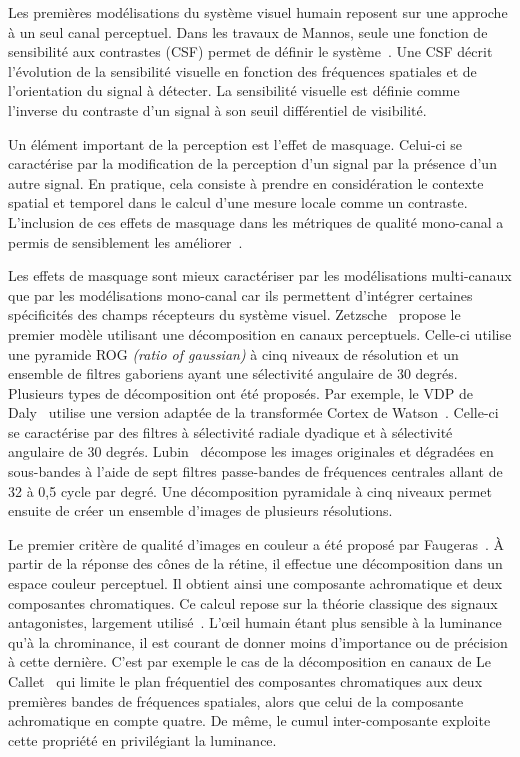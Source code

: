 Les premières modélisations du système visuel humain reposent sur une approche à un seul canal perceptuel. Dans les travaux de Mannos, seule une fonction de sensibilité aux contrastes (CSF) permet de définir le système~\cite{mannos-ieee1974}. Une CSF décrit l'évolution de la sensibilité visuelle en fonction des fréquences spatiales et de l'orientation du signal à détecter. La sensibilité visuelle est définie comme l'inverse du contraste d'un signal à son seuil différentiel de visibilité.

Un élément important de la perception est l'effet de masquage. Celui-ci se caractérise par la modification de la perception d'un signal par la présence d'un autre signal. En pratique, cela consiste à prendre en considération le contexte spatial et temporel dans le calcul d'une mesure locale comme un contraste. L'inclusion de ces effets de masquage dans les métriques de qualité mono-canal a permis de sensiblement les améliorer~\cite{kusayama-pcs2001}.

Les effets de masquage sont mieux caractériser par les modélisations multi-canaux que par les modélisations mono-canal car ils permettent d’intégrer certaines spécificités des champs récepteurs du système visuel. Zetzsche~\cite{zetzsche-vcip1989} propose le premier modèle utilisant une décomposition en canaux perceptuels. Celle-ci utilise une pyramide ROG \emph{(ratio of gaussian)} à cinq niveaux de résolution et un ensemble de filtres gaboriens ayant une sélectivité angulaire de 30 degrés. Plusieurs types de décomposition ont été proposés. Par exemple, le VDP de Daly~\cite{daly-vdp} utilise une version adaptée de la transformée Cortex de Watson~\cite{watson-cortex}. Celle-ci se caractérise par des filtres à sélectivité radiale dyadique et à sélectivité angulaire de 30 degrés. Lubin~\cite{lubin-jnd} décompose les images originales et dégradées en sous-bandes à l'aide de sept filtres passe-bandes de fréquences centrales allant de 32 à 0,5 cycle par degré. Une décomposition pyramidale à cinq niveaux permet ensuite de créer un ensemble d'images de plusieurs résolutions.

Le premier critère de qualité d'images en couleur a été proposé par Faugeras~\cite{faugeras-ieee1979}. À partir de la réponse des cônes de la rétine, il effectue une décomposition dans un espace couleur perceptuel. Il obtient ainsi une composante achromatique et deux composantes chromatiques. Ce calcul repose sur la théorie classique des signaux antagonistes, largement utilisé~\cite{lambrecht-cmpqm,lai-perceptual,krauskopf-vr1982}. L'\oe il humain étant plus sensible à la luminance qu'à la chrominance, il est courant de donner moins d'importance ou de précision à cette dernière. C'est par exemple le cas de la décomposition en canaux de Le Callet~\cite{lecallet-phd} qui limite le plan fréquentiel des composantes chromatiques aux deux premières bandes de fréquences spatiales, alors que celui de la composante achromatique en compte quatre. De même, le cumul inter-composante exploite cette propriété en privilégiant la luminance.

